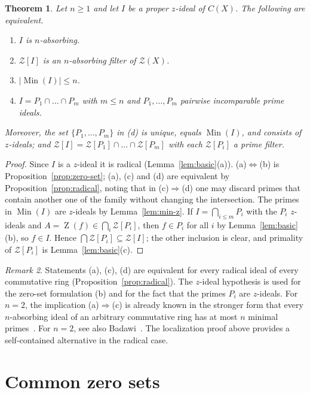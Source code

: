 \documentclass[11pt]{amsart}
\newtheorem{theorem}{Theorem}[section]
\theoremstyle{definition}
\theoremstyle{remark}
\newtheorem{remark}[theorem]{Remark}
\DeclareMathOperator{\Min}{Min}
\DeclareMathOperator{\Z}{Z}
\newcommand{\CZ}{\mathcal Z}
\begin{document}
\begin{theorem}
\label{thm:main-equivalence}
Let $n\ge1$ and let $I$ be a proper $z$-ideal of $C(X)$. The following
are equivalent.
\begin{enumerate}[label=\textup{(\alph*)}]
\item $I$ is $n$-absorbing.
\item $\CZ[I]$ is an $n$-absorbing filter of $\CZ(X)$.
\item $|\Min(I)|\le n$.
\item $I=P_1\cap\dots\cap P_m$ with $m\le n$ and
$P_1,\dots,P_m$ pairwise incomparable prime ideals.
\end{enumerate}
Moreover, the set $\{P_1,\dots,P_m\}$ in \textup{(d)} is unique, equals
$\Min(I)$, and consists of $z$-ideals; and
$\CZ[I]=\CZ[P_1]\cap\dots\cap\CZ[P_m]$ with each $\CZ[P_i]$ a prime filter.
\end{theorem}

\begin{proof}
Since $I$ is a $z$-ideal it is radical (Lemma~\ref{lem:basic}(a)).
(a)$\Leftrightarrow$(b) is Proposition~\ref{prop:zero-set}; (a),
(c) and (d) are equivalent by Proposition~\ref{prop:radical}, noting that
in (c)$\Rightarrow$(d) one may discard primes that contain another one
of the family without changing the intersection.
The primes in $\Min(I)$ are $z$-ideals by Lemma~\ref{lem:min-z}. If
$I=\bigcap_{i\le m}P_i$ with the $P_i$ $z$-ideals and $A=\Z(f)\in\bigcap_i\CZ[P_i]$,
then $f\in P_i$ for all $i$ by Lemma~\ref{lem:basic}(b), so $f\in I$.
Hence $\bigcap\CZ[P_i]\subseteq\CZ[I]$; the other inclusion is clear,
and primality of $\CZ[P_i]$ is Lemma~\ref{lem:basic}(c).
\end{proof}

\begin{remark}
\label{rem:what-is-needed}
Statements (a), (c), (d) are equivalent for every radical ideal of every
commutative ring (Proposition~\ref{prop:radical}). The $z$-ideal
hypothesis is used for the zero-set formulation (b) and for the fact that
the primes $P_i$ are $z$-ideals. For $n=2$, the implication
(a)$\Rightarrow$(c) is already known in the stronger form that every
$n$-absorbing ideal of an arbitrary commutative ring has at most $n$
minimal primes~\cite[Theorem~2.5]{AndersonBadawi}. For $n=2$, see also
Badawi~\cite[Theorems~2.3 and~2.4]{Badawi}. The localization proof above
provides a self-contained alternative in the radical case.
\end{remark}

\section{Common zero sets}
\end{document}
